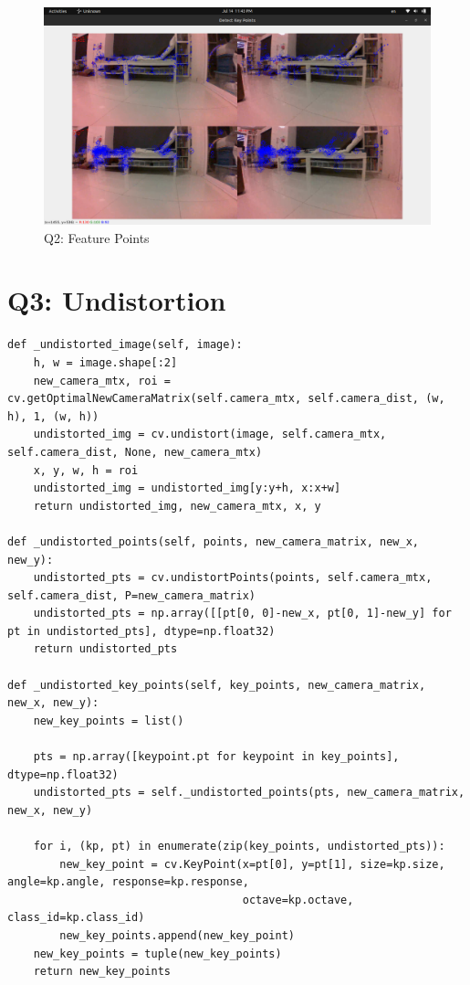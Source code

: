 \documentclass[a4paper, 12pt]{article}
\begin{document}
    \begin{figure}
		\caption{Q2: Feature Points}
		\includegraphics[scale=0.25]{img/feature_points.png}
	\end{figure}

    \section{Q3: Undistortion}

    \begin{lstlisting}
def _undistorted_image(self, image):
    h, w = image.shape[:2]
    new_camera_mtx, roi = cv.getOptimalNewCameraMatrix(self.camera_mtx, self.camera_dist, (w, h), 1, (w, h))
    undistorted_img = cv.undistort(image, self.camera_mtx, self.camera_dist, None, new_camera_mtx)
    x, y, w, h = roi
    undistorted_img = undistorted_img[y:y+h, x:x+w]
    return undistorted_img, new_camera_mtx, x, y

def _undistorted_points(self, points, new_camera_matrix, new_x, new_y):
    undistorted_pts = cv.undistortPoints(points, self.camera_mtx, self.camera_dist, P=new_camera_matrix)
    undistorted_pts = np.array([[pt[0, 0]-new_x, pt[0, 1]-new_y] for pt in undistorted_pts], dtype=np.float32)
    return undistorted_pts

def _undistorted_key_points(self, key_points, new_camera_matrix, new_x, new_y):
    new_key_points = list()

    pts = np.array([keypoint.pt for keypoint in key_points], dtype=np.float32)
    undistorted_pts = self._undistorted_points(pts, new_camera_matrix, new_x, new_y)

    for i, (kp, pt) in enumerate(zip(key_points, undistorted_pts)):
        new_key_point = cv.KeyPoint(x=pt[0], y=pt[1], size=kp.size, angle=kp.angle, response=kp.response,
                                    octave=kp.octave, class_id=kp.class_id)
        new_key_points.append(new_key_point)
    new_key_points = tuple(new_key_points)
    return new_key_points
    \end{lstlisting}
\end{document}

